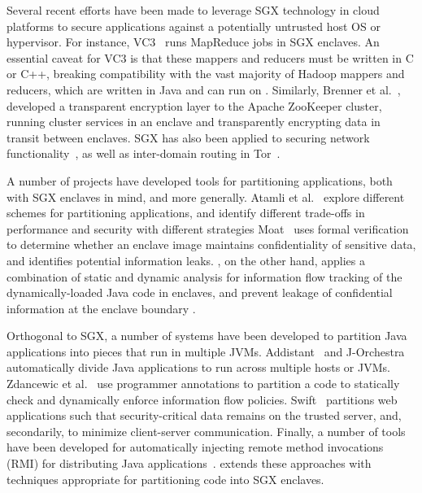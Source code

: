 Several recent efforts have been made to leverage SGX technology
in cloud platforms to secure applications against a potentially untrusted host OS or hypervisor.
For instance, VC3~\citep{vc3} runs MapReduce jobs in SGX enclaves.
An essential caveat for VC3 is that these mappers and reducers must be written
in C or C++, breaking compatibility with the vast majority of Hadoop mappers and reducers,
which are written in Java and can run on \sysname{}.
Similarly, Brenner et al.~\citep{zookeeper}, developed a transparent encryption 
layer to the Apache ZooKeeper cluster,
running cluster services in an enclave and transparently encrypting data in transit between enclaves.
SGX has also been applied to securing network functionality~\citep{shih2016s},
as well as inter-domain routing in Tor~\citep{kim2015first}.


A number of projects have developed tools for partitioning applications, both with SGX enclaves in mind, and more generally.
Atamli et al.~\citep{atamli2015securing} explore different schemes for partitioning applications,
and identify different trade-offs in performance and security with different strategies
Moat~\citep{moat} uses formal verification to determine whether an enclave
image maintains confidentiality of sensitive data,
and identifies potential information leaks.  \sysname{}, on the other hand, applies
a combination of static and dynamic analysis for information flow tracking of the dynamically-loaded Java code in enclaves, and prevent leakage of confidential information at the enclave boundary .%

Orthogonal to SGX, a number of systems have been developed to 
partition Java applications into pieces that run in multiple JVMs.
Addistant~\citep{addistant} and J-Orchestra~\citep{jorchestra}
automatically divide Java applications to run across multiple hosts or JVMs.
Zdancewic et al.~\citep{jif-split} use programmer annotations
to partition a code to statically check and dynamically enforce 
information flow policies.
Swift~\citep{swift} partitions web applications such that
security-critical data remains on the trusted server,
and, secondarily, to minimize client-server communication.
Finally, a number of tools have been developed for automatically injecting remote method invocations (RMI)
for distributing Java applications~\citep{philippsen1997javaparty, czajkowski2002code, spiegel1999pangaea, tilevich2008nrmi, aridor1999cjvm, diaconescu2005compiler}.
\sysname{} extends these approaches with techniques appropriate
for partitioning code into SGX enclaves.

